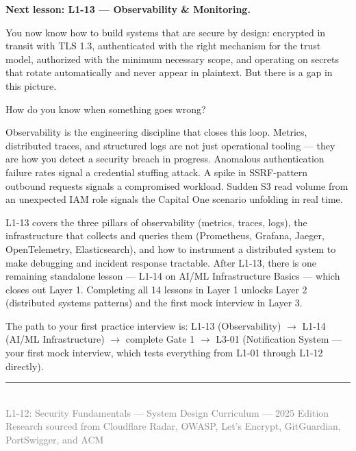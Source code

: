 \documentclass[11pt,a4paper]{article}
\begin{document}
\begin{insightbox}
\textbf{Next lesson: L1-13 --- Observability \& Monitoring.}

You now know how to build systems that are secure by design: encrypted in transit with TLS 1.3, authenticated with the right mechanism for the trust model, authorized with the minimum necessary scope, and operating on secrets that rotate automatically and never appear in plaintext. But there is a gap in this picture.

How do you know when something goes wrong?

Observability is the engineering discipline that closes this loop. Metrics, distributed traces, and structured logs are not just operational tooling --- they are how you detect a security breach in progress. Anomalous authentication failure rates signal a credential stuffing attack. A spike in SSRF-pattern outbound requests signals a compromised workload. Sudden S3 read volume from an unexpected IAM role signals the Capital One scenario unfolding in real time.

L1-13 covers the three pillars of observability (metrics, traces, logs), the infrastructure that collects and queries them (Prometheus, Grafana, Jaeger, OpenTelemetry, Elasticsearch), and how to instrument a distributed system to make debugging and incident response tractable. After L1-13, there is one remaining standalone lesson --- L1-14 on AI/ML Infrastructure Basics --- which closes out Layer 1. Completing all 14 lessons in Layer 1 unlocks Layer 2 (distributed systems patterns) and the first mock interview in Layer 3.

The path to your first practice interview is: L1-13 (Observability) $\rightarrow$ L1-14 (AI/ML Infrastructure) $\rightarrow$ complete Gate 1 $\rightarrow$ L3-01 (Notification System --- your first mock interview, which tests everything from L1-01 through L1-12 directly).
\end{insightbox}

\vspace{1cm}
\begin{center}
\textcolor{gray}{\rule{0.4\textwidth}{0.4pt}}\\[0.3cm]
{\small\textcolor{gray}{L1-12: Security Fundamentals --- System Design Curriculum --- 2025 Edition}}\\
{\small\textcolor{gray}{Research sourced from Cloudflare Radar, OWASP, Let's Encrypt, GitGuardian, PortSwigger, and ACM}}
\end{center}
\end{document}
